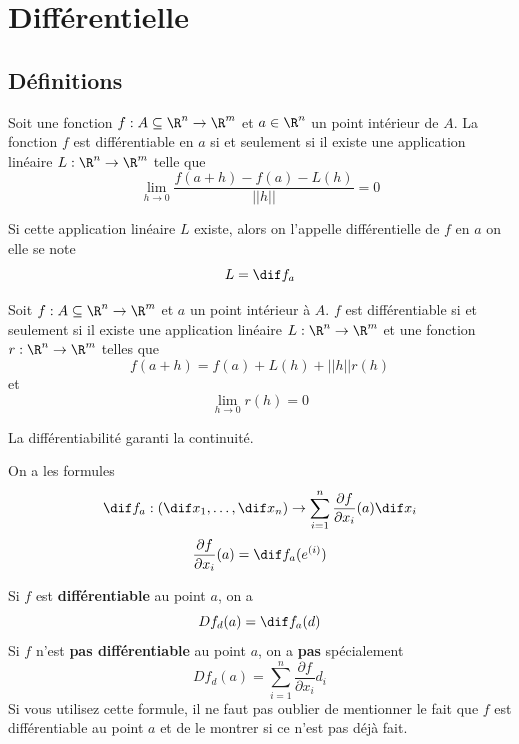 \section{Différentielle}

\subsection{Définitions}

\begin{mydef}[Différentielle]
	Soit une fonction $f : A \subseteq \R^n \to \R^m$ et $a \in \R^n$ un point intérieur de $A$. La fonction $f$ est différentiable en $a$ si et seulement si il existe une application linéaire $L : \R^n \to \R^m$ telle que
	\[ \lim_{h \to 0} \frac{f(a+h) - f(a) - L(h)}{||h||} = 0 \]

	Si cette application linéaire $L$ existe, alors on l'appelle différentielle de $f$ en $a$ on elle se note
	\[ L = \dif f_a \]
\end{mydef}

\begin{myprop}
	Soit $f : A \subseteq \R^n \to \R^m$ et $a$ un point intérieur à $A$. $f$ est différentiable si et seulement si il existe une application linéaire $L : \R^n \to \R^m$ et une fonction $r : \R^n \to \R^m$ telles que
	\[ f(a+h) = f(a) + L(h) + ||h|| r(h) \]
	et
	\[ \lim_{h \to 0}r(h) = 0 \]
\end{myprop}

\begin{myprop}[Continuité]
	La différentiabilité garanti la continuité.
\end{myprop}

\begin{myform} On a les formules
	\[ \dif f_a : (\dif x_1 , \dots , \dif x_n) \to \sum_{i=1}^n \frac{\pa f}{\pa x_i}(a) \dif x_i \]
	\[ \frac{\pa f}{\pa x_i}(a) = \dif f_a(e^{(i)}) \]
\end{myform}

\begin{myform}
	Si $f$ est \textbf{différentiable} au point $a$, on a
	\[ Df_d(a) = \dif f_a(d) \]
	Si $f$ n'est \textbf{pas différentiable} au point $a$, on a \textbf{pas} spécialement
	\[ Df_d(a) = \sum_{i = 1}^n \frac{\partial f}{\partial x_i}d_i \]
	Si vous utilisez cette formule, il ne faut pas oublier de mentionner le fait que $f$ est différentiable au point $a$
	et de le montrer si ce n'est pas déjà fait.
\end{myform}

